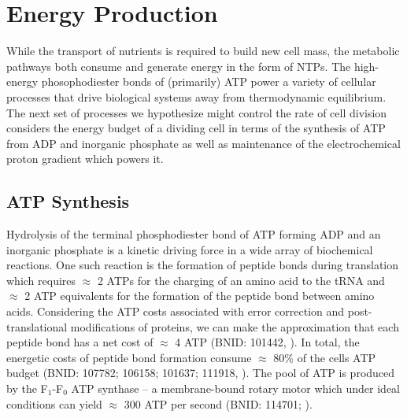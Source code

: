 \section{Energy Production}

While the transport of nutrients is required to build new cell mass, the
metabolic pathways both consume and generate energy
in the form of NTPs. The high-energy phosophodiester bonds of (primarily) ATP
power a variety of cellular processes that drive biological systems away
from thermodynamic equilibrium. The next set of processes we hypothesize might
control the rate of cell division considers the energy budget
of a dividing cell in terms of the synthesis of ATP from ADP and inorganic
phosphate as well as maintenance of the electrochemical proton gradient which powers it.

\subsection{ATP Synthesis}

Hydrolysis of the terminal phosphodiester bond of ATP forming ADP and an
inorganic phosphate is a kinetic driving force in a wide array of biochemical
reactions. One such reaction is the formation of peptide bonds during
translation which requires $\approx$ 2 ATPs for the charging of an amino acid
to the tRNA and $\approx$ 2 ATP equivalents for the formation of the peptide
bond between amino acids. Considering the ATP costs associated with error
correction and post-translational modifications of proteins, we can make the
approximation that each peptide bond has a net cost of $\approx$ 4 ATP (BNID:
101442, \cite{milo2010}). In total, the energetic costs of peptide bond
formation consume $\approx$
80\% of the cells ATP budget (BNID: 107782; 106158; 101637; 111918,
\cite{milo2010, lynch2015,stouthamer1973}). The pool of ATP is produced by
the F$_1$-F$_0$ ATP synthase
-- a membrane-bound rotary motor which under ideal conditions can yield
$\approx$ 300 ATP per second (BNID: 114701; \cite{milo2010, weber2003}).

